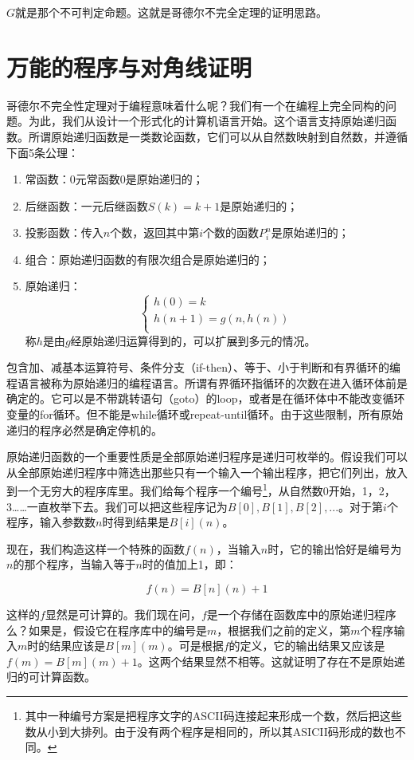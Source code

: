 \documentclass[b5paper]{ctexart}
\begin{document}
$G$就是那个不可判定命题。这就是哥德尔不完全定理的证明思路。

\section{万能的程序与对角线证明}
哥德尔不完全性定理对于编程意味着什么呢？我们有一个在编程上完全同构的问题。为此，我们从设计一个形式化的计算机语言开始。这个语言支持原始递归函数。所谓原始递归函数是一类数论函数，它们可以从自然数映射到自然数，并遵循下面5条公理：

\begin{enumerate}
\item 常函数：0元常函数0是原始递归的；
\item 后继函数：一元后继函数$S(k) = k + 1$是原始递归的；
\item 投影函数：传入$n$个数，返回其中第$i$个数的函数$P_i^n$是原始递归的；
\item 组合：原始递归函数的有限次组合是原始递归的；
\item 原始递归：
\[
\begin{cases}
h(0) = k \\
h(n + 1) = g(n, h(n)) \\
\end{cases}
\]
称$h$是由$g$经原始递归运算得到的，可以扩展到多元的情况。
\end{enumerate}

包含加、减基本运算符号、条件分支（if-then）、等于、小于判断和有界循环的编程语言被称为原始递归的编程语言。所谓有界循环指循环的次数在进入循环体前是确定的。它可以是不带跳转语句（goto）的loop，或者是在循环体中不能改变循环变量的for循环。但不能是while循环或repeat-until循环。由于这些限制，所有原始递归的程序必然是确定停机的。

原始递归函数的一个重要性质是全部原始递归程序是递归可枚举的。假设我们可以从全部原始递归程序中筛选出那些只有一个输入一个输出程序，把它们列出，放入到一个无穷大的程序库里。我们给每个程序一个编号\footnote{其中一种编号方案是把程序文字的ASCII码连接起来形成一个数，然后把这些数从小到大排列。由于没有两个程序是相同的，所以其ASICII码形成的数也不同。}，从自然数0开始，1，2，3……一直枚举下去。我们可以把这些程序记为$B[0], B[1], B[2], ...$。对于第$i$个程序，输入参数数$n$时得到结果是$B[i](n)$。

现在，我们构造这样一个特殊的函数$f(n)$，当输入$n$时，它的输出恰好是编号为$n$的那个程序，当输入等于$n$时的值加上1，即：

\[
f(n) = B[n](n) + 1
\]

这样的$f$显然是可计算的。我们现在问，$f$是一个存储在函数库中的原始递归程序么？如果是，假设它在程序库中的编号是$m$，根据我们之前的定义，第$m$个程序输入$m$时的结果应该是$B[m](m)$。可是根据$f$的定义，它的输出结果又应该是$f(m) = B[m](m) + 1$。这两个结果显然不相等。这就证明了存在不是原始递归的可计算函数。
\end{document}
